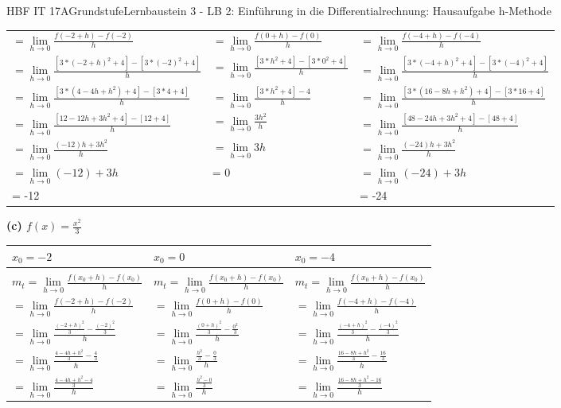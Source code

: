 \documentclass[oneside,openany,headings=optiontotoc,11pt,numbers=noenddot]{scrreprt}
\begin{document}
\begin{worksheet}{HBF IT 17A}{Grundstufe}{Lernbaustein 3 - LB 2: Einführung in die Differentialrechnung: Hausaufgabe h-Methode}
\begin{framed}
\begin{tabularx}{\textwidth}{X|X|X}
				\(=\lim\limits_{h \to 0} \frac{f(-2+h)-f(-2)}{h}\) & \(=\lim\limits_{h \to 0} \frac{f(0+h)-f(0)}{h}\) & \(=\lim\limits_{h \to 0} \frac{f(-4+h)-f(-4)}{h}\)\\
				\(=\lim\limits_{h \to 0} \frac{[3*(-2+h)^2 + 4] - [3*(-2)^2 + 4]}{h}\) & \(=\lim\limits_{h \to 0} \frac{[3*h^2 + 4] - [3*0^2+4]}{h}\) & \(=\lim\limits_{h \to 0} \frac{[3*(-4+h)^2 + 4] - [3*(-4)^2 + 4]}{h}\)\\
				\(=\lim\limits_{h \to 0} \frac{[3*(4 -4h+h^2) +4] -[3*4+4]}{h}\) & \(=\lim\limits_{h \to 0} \frac{[3*h^2 + 4] - 4}{h}\) & \(=\lim\limits_{h \to 0} \frac{[3*(16-8h+h^2)+4] -[3*16+4]}{h}\)\\
				\(=\lim\limits_{h \to 0}\frac{[12-12h+3h^2+4] -[12+4]}{h}\) & \(=\lim\limits_{h \to 0}\frac{3h^2}{h}\) & \(=\lim\limits_{h \to 0}\frac{[48-24h+3h^2+4] -[48+4]}{h}\)\\
				\(=\lim\limits_{h \to 0} \frac{(-12)h +3h^2}{h}\) & \(=\lim\limits_{h \to 0} 3h\) & \(=\lim\limits_{h \to 0} \frac{(-24)h +3h^2}{h}\)\\
				\(=\lim\limits_{h \to 0} (-12)+3h\) & = 0 & \(=\lim\limits_{h \to 0} (-24)+3h\)\\
				= -12 & & = -24
			\end{tabularx}
			\textbf{(c) \(f(x) = \frac{x^2}{3}\)}\\			
			\begin{tabularx}{\textwidth}{X|X|X}
				\(x_0 = -2\) & \(x_0 = 0\) & \(x_0=-4\)\\
				\hline
				\\
				\(m_{t} = \lim\limits_{h \to 0} \frac{f(x_{0}+h) - f(x_0)}{h}\) & \(m_{t} = \lim\limits_{h \to 0} \frac{f(x_{0}+h) - f(x_0)}{h}\) & \(m_{t} = \lim\limits_{h \to 0} \frac{f(x_{0}+h) - f(x_0)}{h}\)\\
				\(=\lim\limits_{h \to 0} \frac{f(-2+h)-f(-2)}{h}\) & \(=\lim\limits_{h \to 0} \frac{f(0+h)-f(0)}{h}\) & \(=\lim\limits_{h \to 0} \frac{f(-4+h)-f(-4)}{h}\)\\
				\(=\lim\limits_{h \to 0} \frac{\frac{(-2+h)^2}{3}-\frac{(-2)^2}{3}}{h}\) & \(=\lim\limits_{h \to 0} \frac{\frac{(0+h)^2}{3}-\frac{0^2}{3}}{h}\) & \(=\lim\limits_{h \to 0} \frac{\frac{(-4+h)^2}{3}-\frac{(-4)^2}{3}}{h}\)\\
				\(=\lim\limits_{h \to 0}\frac{\frac{4-4h+h^2}{3}-\frac{4}{3}}{h}\) & \(=\lim\limits_{h \to 0}\frac{\frac{h^2}{3}-\frac{0}{3}}{h}\) & \(=\lim\limits_{h \to 0}\frac{\frac{16-8h+h^2}{3}-\frac{16}{3}}{h}\)\\
				\(=\lim\limits_{h \to 0}\frac{\frac{4-4h+h^2-4}{3}}{h}\) & \(=\lim\limits_{h \to 0}\frac{\frac{h^2-0}{3}}{h}\) & \(=\lim\limits_{h \to 0}\frac{\frac{16-8h+h^2-16}{3}}{h}\)\\

\end{tabularx}
\end{framed}
\end{worksheet}
\end{document}
